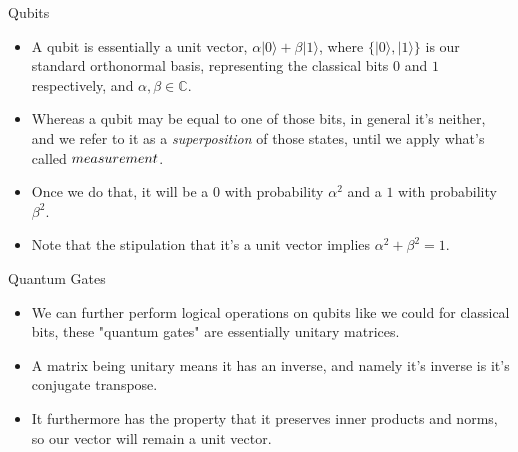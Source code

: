 \documentclass[aspectratio=169]{beamer}
\begin{document}
\begin{frame}{Qubits}
  \begin{itemize}
    \item A qubit is essentially a unit vector, $\alpha |0\rangle + \beta |1\rangle$, where $\{|0\rangle, |1\rangle\}$ is our standard orthonormal basis, representing the classical bits $0$ and $1$ respectively, and $\alpha, \beta \in \mathbb{C}$. \pause
    \item Whereas a qubit may be equal to one of those bits, in general it's neither, and we refer to it as a \emph{superposition} of those states, until we apply what's called $\emph{measurement}$. \pause
    \item Once we do that, it will be a $0$ with probability $\alpha^2$ and a $1$ with probability $\beta^2$. \pause
    \item Note that the stipulation that it's a unit vector implies $\alpha^2 + \beta^2 = 1$.
  \end{itemize}
\end{frame}

\begin{frame}{Quantum Gates}
  \begin{itemize}
    \item We can further perform logical operations on qubits like we could for classical bits, these "quantum gates" are essentially unitary matrices. \pause
    \item A matrix being unitary means it has an inverse, and namely it's inverse is it's conjugate transpose. \pause
    \item It furthermore has the property that it preserves inner products and norms, so our vector will remain a unit vector. 
  \end{itemize}
\end{frame}
\end{document}
